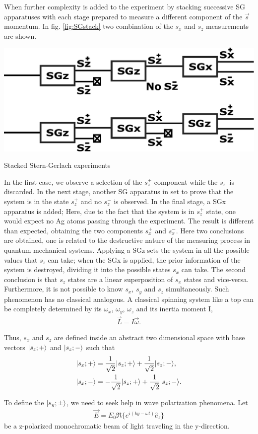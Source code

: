 \documentclass{article}
\begin{document}
When further complexity is added to the experiment by stacking successive SG apparatuses with each stage prepared to measure a different component of the $\vec{s}$ momentum. In fig. \ref{fig:SGstack} two combination of the $s_x$ and $s_z$ measurements are shown.
\begin{marginfigure}%
  \begin{centering}
  \includegraphics[width=\linewidth]{figures/SGstack.pdf}
  \caption{Stacked Stern-Gerlach experiments}
  \label{fig:SGstack}
  \end{centering}
\end{marginfigure}
In the first case, we observe a selection of the $s_z ^+$ component while the $s_z ^-$ is discarded. In the next stage, another SG apparatus in set to prove that the system is in the state $s_z ^+$ and no $s_z ^-$ is observed. In the final stage, a SGx apparatus is added; Here, due to the fact that the system is in $s_z ^+$ state, one would expect no Ag atoms passing through the experiment. The result is different than expected, obtaining the two components $s_x ^+$ and $s_x ^-$.
Here two conclusions are obtained, one is related to the destructive nature of the measuring process in quantum mechanical systems. Applying a SGz sets the system in all the possible values that $s_z$ can take; when the SGx is applied, the prior information of the system is destroyed, dividing it into the possible states $s_x$ can take. The second conclusion is that $s_z$ states are a linear superposition of $s_x$ states and vice-versa. Furthermore, it is not possible to know $s_x$, $s_y$ and $s_z$ simultaneously. Such phenomenon has no classical analogous. A classical spinning system like a top can be completely determined by its $\omega_x$, $\omega_y$, $\omega_z$ and its inertia moment I,
\begin{align}\label{eq:angularmom}
  \vec{L} = I\vec{\omega}.
\end{align}

Thus, $s_x$ and $s_z$ are defined inside an abstract two dimensional space with base vectors $\lvert s_z;+\rangle$ and $\lvert s_z;-\rangle$ such that
\begin{align}\label{eq:superposition}
  \lvert s_x;+\rangle&=\frac{1}{\sqrt{2}}\lvert s_z;+\rangle+\frac{1}{\sqrt{2}}\lvert s_z;-\rangle,\\
  \lvert s_x;-\rangle&=-\frac{1}{\sqrt{2}}\lvert s_z;+\rangle+\frac{1}{\sqrt{2}}\lvert s_z;-\rangle.
\end{align}

To define the $\lvert s_y;\pm\rangle$, we need to seek help in wave polarization phenomena. Let
\begin{align}\label{eq:monochromaticbeam}
  \vec{E}=E_0\Re\{e^{i(ky-\omega t)}\hat{e}_z\}
\end{align}
be a z-polarized monochromatic beam of light traveling in the y-direction.
\end{document}
